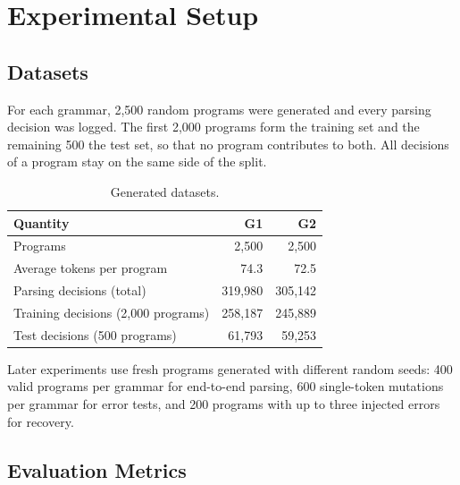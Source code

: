 \documentclass[12pt,a4paper]{article}
\begin{document}
\newpage
\section{Experimental Setup}

\subsection{Datasets}

For each grammar, 2,500 random programs were generated and every parsing
decision was logged. The first 2,000 programs form the training set and the
remaining 500 the test set, so that no program contributes to both. All
decisions of a program stay on the same side of the split.

\begin{table}[H]
\centering
\caption{Generated datasets.}
\label{tab:data}
\begin{tabular}{lrr}
\toprule
\textbf{Quantity} & \textbf{G1} & \textbf{G2}\\
\midrule
Programs & 2,500 & 2,500\\
Average tokens per program & 74.3 & 72.5\\
Parsing decisions (total) & 319,980 & 305,142\\
Training decisions (2,000 programs) & 258,187 & 245,889\\
Test decisions (500 programs) & 61,793 & 59,253\\
\bottomrule
\end{tabular}
\end{table}

Later experiments use fresh programs generated with different random seeds:
400 valid programs per grammar for end-to-end parsing, 600 single-token
mutations per grammar for error tests, and 200 programs with up to three
injected errors for recovery.

\subsection{Evaluation Metrics}
\end{document}
